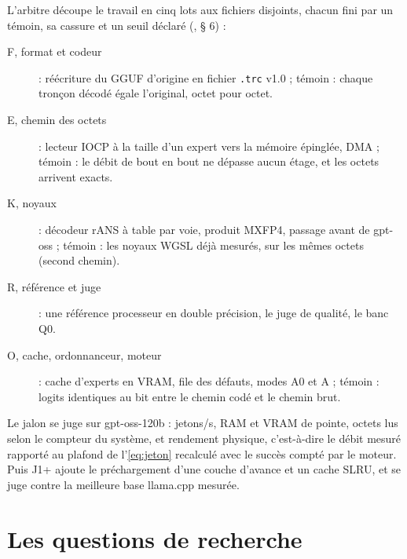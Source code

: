 L'arbitre découpe le travail en cinq lots aux fichiers disjoints, chacun fini par un témoin, sa cassure et un seuil déclaré (, § 6) :
\begin{description}
\item[F, format et codeur] : réécriture du GGUF d'origine en fichier \texttt{.trc} v1.0 ; témoin : chaque tronçon décodé égale l'original, octet pour octet.
\item[E, chemin des octets] : lecteur IOCP à la taille d'un expert vers la mémoire épinglée, DMA ; témoin : le débit de bout en bout ne dépasse aucun étage, et les octets arrivent exacts.
\item[K, noyaux] : décodeur rANS à table par voie, produit MXFP4, passage avant de gpt-oss ; témoin : les noyaux WGSL déjà mesurés, sur les mêmes octets (second chemin).
\item[R, référence et juge] : une référence processeur en double précision, le juge de qualité, le banc Q0.
\item[O, cache, ordonnanceur, moteur] : cache d'experts en VRAM, file des défauts, modes A0 et A ; témoin : logits identiques au bit entre le chemin codé et le chemin brut.
\end{description}
Le jalon se juge sur gpt-oss-120b : jetons/s, RAM et VRAM de pointe, octets lus selon le compteur du système, et rendement physique, c'est-à-dire le débit mesuré rapporté au plafond de l'\cref{eq:jeton} recalculé avec le succès compté par le moteur. Puis J1+ ajoute le préchargement d'une couche d'avance et un cache SLRU, et se juge contre la meilleure base llama.cpp mesurée.

\section{Les questions de recherche}\label{sec:questions-recherche}

